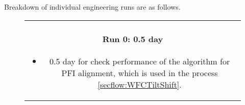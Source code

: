 \bigskip

Breakdown of individual engineering runs are as follows.

\begin{figure}[!ht]
\begin{center}
\begin{tabular}{c}
\begin{minipage}{0.95\hsize}
\paragraph{Run 0: 0.5 day}
	\begin{itemize}
	\item 0.5 day for check performance of the algorithm for PFI alignment, which is used in the process \ref{secflow:WFCTiltShift}.
	\end{itemize}
\end{minipage}
\end{tabular}
\end{center}
\end{figure}

